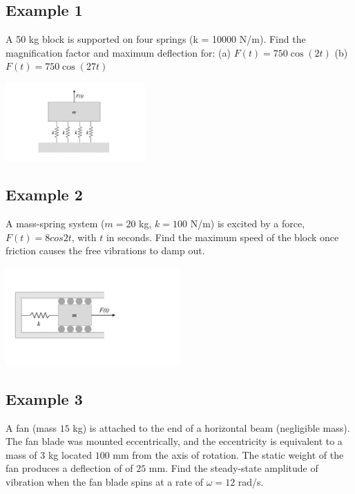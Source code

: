 \documentclass[12pt,letterpaper,twoside]{report}
\begin{document}
\newpage 

\subsection{Example 1}
A 50 kg block is supported on four springs (k = 10000 N/m). Find the magnification factor and maximum deflection for:
(a) $F(t) = 750 \cos (2t)$
(b) $F(t) = 750 \cos (27t)$

\includegraphics[trim={6cm 1cm 6cm 1cm},clip,width=0.4\textwidth, left]{Slide89}

\vspace*{10\baselineskip}

\subsection{Example 2}
A mass-spring system ($m = 20$ kg, $k = 100$ N/m) is excited by a force, $F(t) = 8 cos 2t$, with $t$ in seconds.  Find the maximum speed of the block once friction causes the free vibrations to damp out.  

\includegraphics[trim={1cm 4cm 8cm 4cm},clip,width=0.5\textwidth, left]{Slide90}

\newpage
\vspace*{5\baselineskip}

\subsection{Example 3}
A fan (mass $15$ kg) is attached to the end of a horizontal beam (negligible mass).  The fan blade was mounted eccentrically, and the eccentricity is equivalent to a mass of $3$ kg located $100$ mm from the axis of rotation.  The static weight of the fan produces a deflection of of $25$ mm. Find the steady-state amplitude of vibration when the fan blade spins at a rate of $\omega = 12$ rad/s.  
\end{document}
